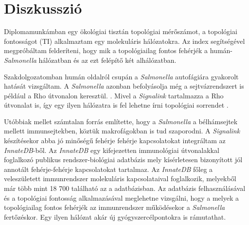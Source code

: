 \documentclass[a4paper,12pt]{article}
\begin{document}
		\pagebreak
	
\section{Diszkusszió}
		Diplomamunkámban egy ökológiai tisztán topológiai mérőszámot, a topológiai fontosságot (TI) alkalmaztam egy molekuláris hálózatokra. Az index segítségével megpróbáltam felderíteni, hogy mik a topológiailag fontos fehérjék a humán-\textit{Salmonella} hálózatban és az ezt felépítő két alhálózatban. 
		
		Szakdolgozatomban humán oldalról csupán a \textit{Salmonella} autofágiára gyakorolt hatását vizsgáltam. A \textit{Salmonella} azonban befolyásolja még a sejtvázrendszert is például a Rho útvonalon keresztül. \cite{salmonella_and_host_cell_nature} \cite{salmonella_autophagy_nature_old}. Mivel a \textit{Signalink} tartalmazza a Rho útvonalat is, így egy ilyen hálózatra is fel lehetne írni topológiai sorrendet .
		
		Utóbbiak mellet számtalan forrás \cite{salmonella_and_host_cell_nature} \cite{salmonella_autophagy_nature_old} \cite{hilD} említette, hogy a \textit{Salmonella} a bélhámsejtek mellett immunsejtekben, köztük makrofágokban is tud szaporodni. A \textit{Signalink} készítésekor abba jó minőségű fehérje fehérje kapcsolatokat integráltam az \textit{InnateDB}-ből. Az \textit{InnateDB} egy kifejezetten immunológiai útvonalakkal foglalkozó publikus rendszer-biológiai adatbázis mely kísérletesen bizonyított jól annotált fehérje-fehérje kapcsolatokat tartalmaz. Az \textit{InnateDB} főleg a veleszületett immunrendszer molekuláris kapcsolataival foglalkozik, melyekből már több mint 18 700 található az a adatbázisban. \cite{innatedb} Az adatbázis felhasználásával és a topológiai fontosság alkalmazásával meglehetne vizsgálni, hogy a melyek a topológiailag fontos fehérjék az immunrendszer működésekor a \textit{Salmonella} fertőzéskor. Egy ilyen hálózat akár új gyógyszercélpontokra is rámutathat.
		
\end{document}
